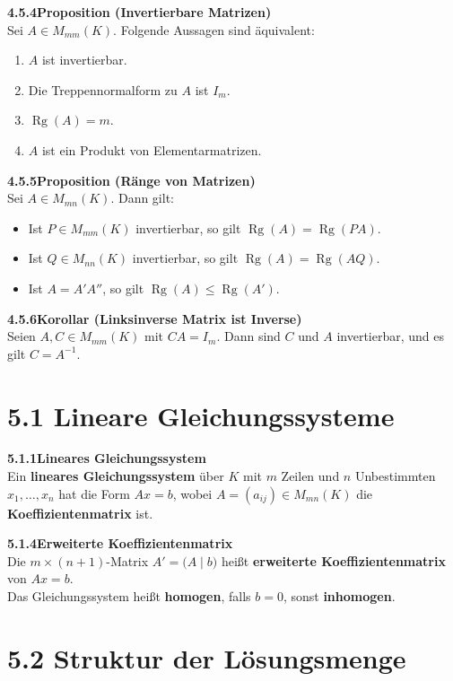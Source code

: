 \documentclass[a4paper,12pt]{article}
\newcommand{\gentry}[3]{%
  \noindent\textbf{#1\quad #2}\nopagebreak\\[0.2em]
  #3\par\smallskip
}
\begin{document}
\gentry{4.5.4}{Proposition (Invertierbare Matrizen)}{%
  Sei $A \in M_{mm}(K)$. Folgende Aussagen sind äquivalent:
  \begin{enumerate}[label=(\alph*),topsep=2pt,itemsep=1pt]
    \item $A$ ist invertierbar.
    \item Die Treppennormalform zu $A$ ist $I_m$.
    \item $\operatorname{Rg}(A) = m$.
    \item $A$ ist ein Produkt von Elementarmatrizen.
  \end{enumerate}
}

\gentry{4.5.5}{Proposition (Ränge von Matrizen)}{%
  Sei $A \in M_{mn}(K)$. Dann gilt:
  \begin{itemize}[topsep=2pt,itemsep=1pt]
    \item Ist $P \in M_{mm}(K)$ invertierbar, so gilt $\operatorname{Rg}(A) = \operatorname{Rg}(PA)$.
    \item Ist $Q \in M_{nn}(K)$ invertierbar, so gilt $\operatorname{Rg}(A) = \operatorname{Rg}(AQ)$.
    \item Ist $A = A'A''$, so gilt $\operatorname{Rg}(A) \le \operatorname{Rg}(A')$.
  \end{itemize}
}

\gentry{4.5.6}{Korollar (Linksinverse Matrix ist Inverse)}{%
  Seien $A, C \in M_{mm}(K)$ mit $CA = I_m$.
  Dann sind $C$ und $A$ invertierbar, und es gilt $C = A^{-1}$.
}

\section*{5.1 \quad Lineare Gleichungssysteme}

\gentry{5.1.1}{Lineares Gleichungssystem}{%
  Ein \textbf{lineares Gleichungssystem} über $K$ mit $m$ Zeilen und $n$
  Unbestimmten $x_1,\ldots,x_n$ hat die Form $Ax = b$, wobei
  $A = (a_{ij}) \in M_{mn}(K)$ die \textbf{Koeffizientenmatrix} ist.
}

\gentry{5.1.4}{Erweiterte Koeffizientenmatrix}{%
  Die $m \times (n+1)$-Matrix $A' = \bigl(A \mid b\bigr)$ heißt
  \textbf{erweiterte Koeffizientenmatrix} von $Ax = b$.
  \smallskip\\
  Das Gleichungssystem heißt \textbf{homogen}, falls $b = 0$, sonst \textbf{inhomogen}.
}

\section*{5.2 \quad Struktur der Lösungsmenge}
\end{document}
